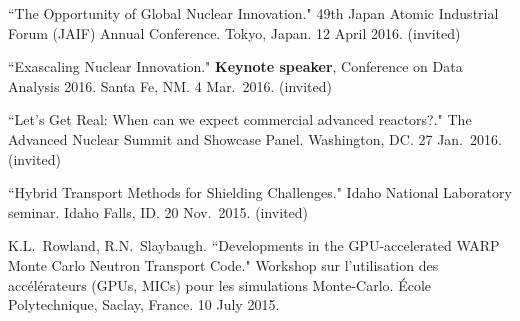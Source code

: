\begin{bibsection}




\item ``The Opportunity of Global Nuclear Innovation." 49th Japan Atomic Industrial Forum (JAIF) Annual Conference. Tokyo, Japan. 12 April 2016. (invited)

\item ``Exascaling Nuclear Innovation." \textbf{Keynote speaker}, Conference on Data Analysis 2016. Santa Fe, NM. 4 Mar.\ 2016. (invited) 


\item ``Let’s Get Real: When can we expect commercial
advanced reactors?." The Advanced Nuclear Summit and Showcase Panel. Washington, DC. 27 Jan.\ 2016. (invited)

\item ``Hybrid Transport Methods for Shielding Challenges." Idaho National Laboratory seminar. Idaho Falls, ID. 20 Nov.\ 2015. (invited) 

\item K.L.\ Rowland, R.N.\ Slaybaugh. ``Developments in the GPU-accelerated WARP Monte Carlo Neutron Transport Code." Workshop sur l'utilisation des acc\'{e}l\'{e}rateurs (GPUs, MICs) pour les simulations Monte-Carlo. \'{E}cole Polytechnique, Saclay, France. 10 July 2015. 



\end{bibsection}
